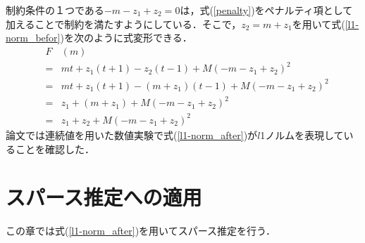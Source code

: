 \documentclass[technicalreport]{ieicej}
\begin{document}
制約条件の１つである$-m-z_{1}+z_{2}=0$は，式(\ref{penalty})をペナルティ項として加えることで制約を満たすようにしている．そこで，$z_{2}=m+z_{1}$を用いて式(\ref{l1-norm_befor})を次のように式変形できる．
\begin{eqnarray}
  &F&(m) \nonumber \\
  &=& mt+z_{1}(t+1)-z_{2}(t-1)+M(-m-z_{1}+z_{2})^{2} \nonumber \\
  &=& mt+z_{1}(t+1)-(m+z_{1})(t-1)+M(-m-z_{1}+z_{2})^{2} \nonumber \\
  &=& z_{1}+(m+z_{1})+M(-m-z_{1}+z_{2})^{2} \nonumber \\
  &=& z_{1}+z_{2}+M(-m-z_{1}+z_{2})^{2} \label{l1-norm_after}
\end{eqnarray}
論文\cite{l1-norm}では連続値を用いた数値実験で式(\ref{l1-norm_after})が$l$1ノルムを表現していることを確認した．

\section{スパース推定への適用}
この章では式(\ref{l1-norm_after})を用いてスパース推定を行う．
 
  
  


  

  
  
\end{document}
